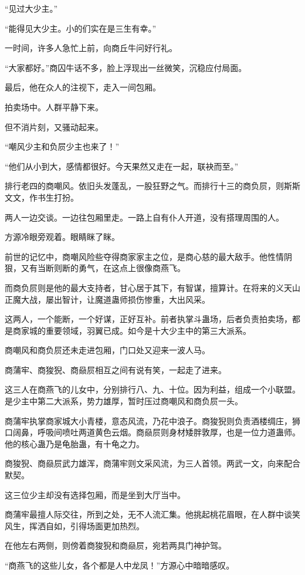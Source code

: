 \begin{this_body}
“见过大少主。”

“能得见大少主。小的们实在是三生有幸。”

一时间，许多人急忙上前，向商丘牛问好行礼。

“大家都好。”商囚牛话不多，脸上浮现出一丝微笑，沉稳应付局面。

最后，他在众人的注视下，走入一间包厢。

拍卖场中。人群平静下来。

但不消片刻，又骚动起来。

“嘲风少主和负屃少主也来了！”

“他们从小到大，感情都很好。今天果然又走在一起，联袂而至。”

排行老四的商嘲风。依旧头发蓬乱，一股狂野之气。而排行十三的商负屃，则斯斯文文，作书生打扮。

两人一边交谈。一边往包厢里走。一路上自有仆人开道，没有搭理周围的人。

方源冷眼旁观着。眼睛眯了眯。

前世的记忆中，商嘲风险些夺得商家家主之位，是商心慈的最大敌手。他性情阴狠，又有当断则断的勇气，在这点上很像商燕飞。

而商负屃则是他的最大支持者，甘心居于其下，有智谋，擅算计。在将来的义天山正魔大战，屡出智计，让魔道蛊师损伤惨重，大出风采。

这两人，一个能断，一个好谋，正好互补。前者执掌斗蛊场，后者负责拍卖场，都是商家城的重要领域，羽翼已成。如今是十大少主中的第三大派系。

商嘲风和商负屃还未走进包厢，门口处又迎来一波人马。

商蒲牢、商狻猊、商赑屃相互之间有说有笑，一起走了进来。

这三人在商燕飞的儿女中，分别排行八、九、十位。因为利益，组成一个小联盟。是少主中第二大派系，势力雄厚，暂时压过商嘲风和商负屃一头。

商蒲牢执掌商家城大小青楼，意态风流，乃花中浪子。商狻猊则负责酒楼绸庄，狮口阔鼻，呼吸间喷吐两道黄色云烟。商赑屃则身材矮胖敦厚，也是一位力道蛊师。他的核心蛊乃是龟胎蛊，有十龟之力。

商狻猊、商赑屃武力雄浑，商蒲牢则文采风流，为三人首领。两武一文，向来配合默契。

这三位少主却没有选择包厢，而是坐到大厅当中。

商蒲牢最擅人际交往，所到之处，无不人流汇集。他挑起桃花眉眼，在人群中谈笑风生，挥洒自如，引得场面更加热烈。

在他左右两侧，则傍着商狻猊和商赑屃，宛若两具门神护驾。

“商燕飞的这些儿女，各个都是人中龙凤！”方源心中暗暗感叹。


\end{this_body}
